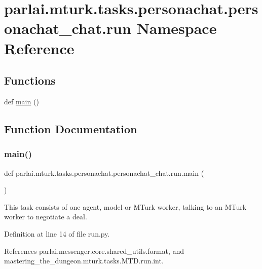 \hypertarget{namespaceparlai_1_1mturk_1_1tasks_1_1personachat_1_1personachat__chat_1_1run}{}\section{parlai.\+mturk.\+tasks.\+personachat.\+personachat\+\_\+chat.\+run Namespace Reference}
\label{namespaceparlai_1_1mturk_1_1tasks_1_1personachat_1_1personachat__chat_1_1run}
\subsection*{Functions}
\begin{DoxyCompactItemize}
\item 
def \hyperlink{namespaceparlai_1_1mturk_1_1tasks_1_1personachat_1_1personachat__chat_1_1run_a1ba907ef6c5ac6a41561053ca22901d2}{main} ()
\end{DoxyCompactItemize}


\subsection{Function Documentation}
\mbox{\label{namespaceparlai_1_1mturk_1_1tasks_1_1personachat_1_1personachat__chat_1_1run_a1ba907ef6c5ac6a41561053ca22901d2}} 
\subsubsection{\texorpdfstring{main()}{main()}}
{\footnotesize\ttfamily def parlai.\+mturk.\+tasks.\+personachat.\+personachat\+\_\+chat.\+run.\+main (\begin{DoxyParamCaption}{ }\end{DoxyParamCaption})}

\begin{DoxyVerb}This task consists of one agent, model or MTurk worker, talking to an
MTurk worker to negotiate a deal.
\end{DoxyVerb}
 

Definition at line 14 of file run.\+py.



References parlai.\+messenger.\+core.\+shared\+\_\+utils.\+format, and mastering\+\_\+the\+\_\+dungeon.\+mturk.\+tasks.\+M\+T\+D.\+run.\+int.

